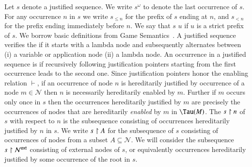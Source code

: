 \documentclass{elsarticle}
\theoremstyle{plain}
\theoremstyle{definition}
\newcommand\Nodes{\mathcal{N}}%
\newcommand{\enables}{\vdash} %
\newcommand{\ctree}{\Tau} %
\newcommand{\ExternalNodes}{\Nodes^{\sf ext}}
\begin{document}
Let $s$ denote a justified sequence. We write $s^\omega$ to denote the last occurrence of $s$. For any occurrence $n$ in $s$ we write $s_{\leq n}$ for the prefix of $s$ ending at $n$, and $s_{<n}$ for the prefix ending immediately before $n$.
We say that $s$  $u$ if $u$ is a strict prefix of $s$.
%
%
We borrow basic definitions from Game Semantics~\cite{Abr02}. A justified sequence verifies the  if it starts with a lambda node and subsequently alternates between (i) a variable or application node (ii) a lambda node.
An occurrence in a justified sequence is  if recursively following justification pointers starting from the first occurrence leads to the second one.
Since justification pointers honor the enabling relation $\enables$, if an occurrence of node $n$ is hereditarily justified by occurrence of a node $m\in\Nodes$ then $n$ is necessarily hereditarily enabled by $m$. Further if $m$ occurs only once in $s$ then the occurrences hereditarily justified by $m$ are precisely the occurrences of nodes that are hereditarily \emph{enabled} by $m$ in $\ctree(M)$.
%
The  $s\upharpoonright n$ of $s$ with respect to $n$ is the subsequence consisting of occurrences hereditarily justified by $n$ in $s$. We write $s \upharpoonright A$ for the subsequence of $s$ consisting of occurrences of nodes from a subset $A \subseteq \Nodes$.
We will consider the subsequence $s\filter\ExternalNodes$ consisting of external nodes of $s$, or equivalently occurrences hereditarily justified by some occurrence of the root in $s$.
\end{document}
